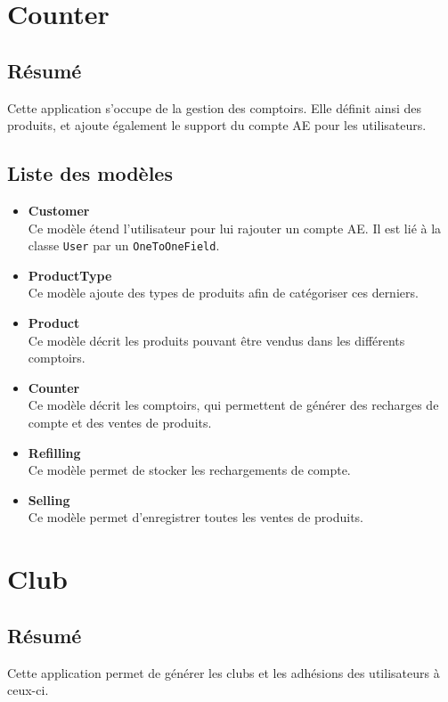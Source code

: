 \documentclass[a4paper]{report}
\begin{document}
\section{Counter}
\label{sec:counter}
\subsection{Résumé}
\label{sub:resume}
\par Cette application s'occupe de la gestion des comptoirs. Elle définit ainsi des produits, et ajoute également le
support du compte AE pour les utilisateurs.

\subsection{Liste des modèles}
\label{sub:liste_des_modeles}
\begin{itemize}
    \item \textbf{Customer} \\
        Ce modèle étend l'utilisateur pour lui rajouter un compte AE. Il est lié à la classe \verb#User# par un
        \verb#OneToOneField#.
    \item \textbf{ProductType} \\
        Ce modèle ajoute des types de produits afin de catégoriser ces derniers.
    \item \textbf{Product} \\
        Ce modèle décrit les produits pouvant être vendus dans les différents comptoirs.
    \item \textbf{Counter} \\
        Ce modèle décrit les comptoirs, qui permettent de générer des recharges de compte et des ventes de produits.
    \item \textbf{Refilling} \\
        Ce modèle permet de stocker les rechargements de compte.
    \item \textbf{Selling} \\
        Ce modèle permet d'enregistrer toutes les ventes de produits.
\end{itemize}


\section{Club}
\label{sec:club}
\subsection{Résumé}
\label{sub:resume}
\par Cette application permet de générer les clubs et les adhésions des utilisateurs à ceux-ci.
\end{document}
